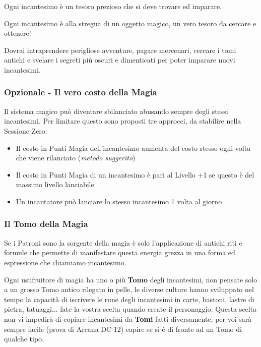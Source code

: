 \begin{multicols}{2}
\begin{changemargin}{0.3cm}{0.3cm}\begin{tcolorbox}[title = Scegliere gli Incantesimi]
Ogni incantesimo è un tesoro prezioso che si deve trovare ed imparare.

Ogni incantesimo è alla stregua di un oggetto magico, un vero tesoro da cercare e ottenere!

Dovrai intraprendere perigliose avventure, pagare mercenari, cercare i tomi antichi e svelare i segreti più oscuri e dimenticati per poter imparare nuovi incantesimi.
\end{tcolorbox}\end{changemargin}

\subsubsection{Opzionale - Il vero costo della Magia}

Il sistema magico può diventare sbilanciato abusando sempre degli stessi incantesimi. Per limitare questo sono proposti tre approcci, da stabilire nella Sessione Zero:

\begin{itemize}[leftmargin=*] \setlength{\itemsep}{0pt}
\item Il costo in Punti Magia dell'incantesimo aumenta del costo stesso ogni volta che viene rilanciato (\emph{metodo suggerito})
\item Il costo in Punti Magia di un incantesimo è pari al Livello +1 se questo è del massimo livello lanciabile
\item Un incantatore può lanciare lo stesso incantesimo 1 volta al giorno
\end{itemize}

\subsubsection{Il Tomo della Magia}\label{magietomodellamagia}

Se i Patroni sono la sorgente della magia è solo l'applicazione di antichi riti e formule che permette di manifestare questa energia grezza in una forma ed espressione che chiamiamo incantesimo.

Ogni usufruitore di magia ha uno o più \textbf{Tomo} degli incantesimi, non pensate solo a un grosso Tomo antico rilegato in pelle, le diverse culture hanno sviluppato nel tempo la capacità di iscrivere le rune degli incantesimi in carte, bastoni, lastre di pietra, tatuaggi... fate la vostra scelta quando create il personaggio.
Questa scelta non vi impedirà di copiare incantesimi da \textbf{Tomi} fatti diversamente, per voi sarà sempre facile (prova di Arcana DC 12) capire se si è di fronte ad un Tomo di qualche tipo.


\end{multicols}
